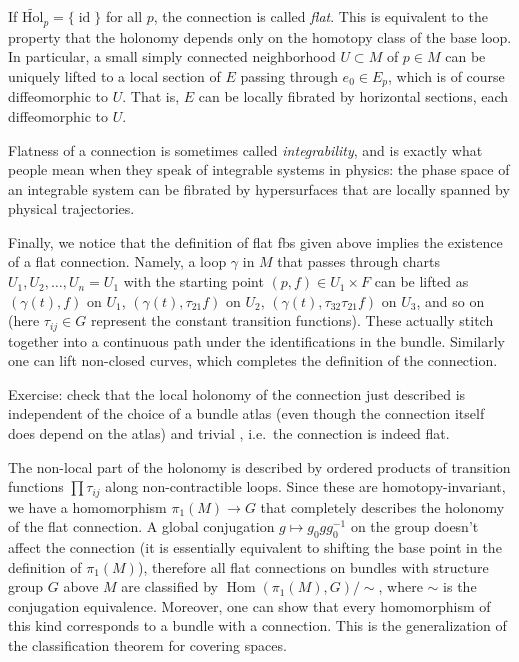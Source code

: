 \documentclass[english,letterpaper]{article}%
\numberwithin{equation}{section}
\numberwithin{figure}{section}
\numberwithin{table}{section}
\theoremstyle{definition}
\theoremstyle{definition}
\theoremstyle{definition}
\theoremstyle{plain}
\theoremstyle{plain}
\theoremstyle{plain}
\theoremstyle{plain}
\theoremstyle{remark}
\theoremstyle{remark}
\DeclareMathOperator{\id}{id}
\DeclareMathOperator{\Hom}{Hom}
\begin{document}
\begin{example}
	If $\widetilde{\mathrm{Hol}}_p=\{\id\}$ for all $p$, the connection is called \emph{flat}. This is equivalent to the property that the holonomy depends only on the homotopy class of the base loop. In particular, a small simply connected neighborhood $U\subset M$ of $p\in M$ can be uniquely lifted to a local section of $E$ passing through $e_0\in E_p$, which is of course diffeomorphic to $U$. That is, $E$ can be locally fibrated by horizontal sections, each diffeomorphic to $U$. 
	
	Flatness of a connection is sometimes called \emph{integrability}, and is exactly what people mean when they speak of integrable systems in physics: the phase space of an integrable system can be fibrated by hypersurfaces that are locally spanned by physical trajectories.
	
	Finally, we notice that the definition of flat \glspl{fb} given above implies the existence of a flat connection. Namely, a loop $\gamma$ in $M$ that passes through charts $U_1,U_2,\ldots,U_n=U_1$ with the starting point $(p,f)\in U_1\times F$ can be lifted as $(\gamma(t),f)$ on $U_1$, $(\gamma(t),\tau_{21}f)$ on $U_2$, $(\gamma(t),\tau_{32}\tau_{21}f)$ on $U_3$, and so on (here $\tau_{ij}\in G$ represent the constant transition functions). These actually stitch together into a continuous path under the identifications in the bundle. Similarly one can lift non-closed curves, which completes the definition of the connection.
	
	Exercise: check that the local holonomy of the connection just described is independent of the choice of a bundle atlas (even though the connection itself does depend on the atlas) and trivial , i.e.\ the connection is indeed flat.
	
	The non-local part of the holonomy is described by ordered products of transition functions $\prod \tau_{ij}$ along non-contractible loops. Since these are homotopy-invariant, we have a homomorphism $\pi_1(M)\to G$ that completely describes the holonomy of the flat connection. A global conjugation $g\mapsto g_0 g g_0^{-1}$ on the group doesn't affect the connection (it is essentially equivalent to shifting the base point in the definition of $\pi_1(M)$), therefore all flat connections on bundles with structure group $G$ above $M$ are classified by $\Hom(\pi_1(M),G)/\sim$, where $\sim$ is the conjugation equivalence. Moreover, one can show that every homomorphism of this kind corresponds to a bundle with a connection. This is the generalization of the classification theorem for covering spaces.
	

\end{example}
\end{document}
